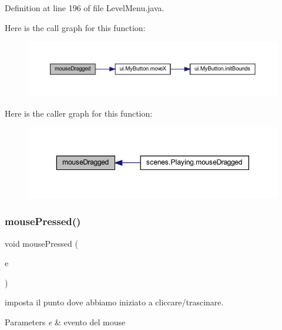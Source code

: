 Definition at line 196 of file Level\+Menu.\+java.

Here is the call graph for this function\+:\nopagebreak
\begin{figure}[H]
\begin{center}
\leavevmode
\includegraphics[width=350pt]{classui_1_1_level_menu_adbfc0588c017133c9b7070474402b72f_cgraph}
\end{center}
\end{figure}
Here is the caller graph for this function\+:\nopagebreak
\begin{figure}[H]
\begin{center}
\leavevmode
\includegraphics[width=350pt]{classui_1_1_level_menu_adbfc0588c017133c9b7070474402b72f_icgraph}
\end{center}
\end{figure}
\mbox{\label{classui_1_1_level_menu_aed82e1ce3dd3cf283d508c3ba3be70ef}} 
\subsubsection{\texorpdfstring{mouse\+Pressed()}{mousePressed()}}
{\footnotesize\ttfamily void mouse\+Pressed (\begin{DoxyParamCaption}\item[{Mouse\+Event}]{e }\end{DoxyParamCaption})}



imposta il punto dove abbiamo iniziato a cliccare/trascinare. 


\begin{DoxyParams}{Parameters}
{\em e} & evento del mouse \\
\hline
\end{DoxyParams}


